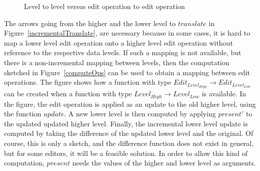 \begin{figure}
\begin{small}
\begin{center}
\begin{center}
\begin{small}
\bigskip \noindent
{}
\end{small}
\end{center}\caption{Level to level versus edit operation to edit operation }\label{fromLevelToOp} 
\end{center}
\end{small}
\end{figure}


The arrows going from the higher and the lower level to $translate$ in Figure~\ref{incrementalTranslate}, are necessary because in some cases, it is hard to map a lower level edit operation onto a higher level edit operation without reference to the respective data levels. If such a mapping is not available, but there is a non-incremental mapping between levels, then the computation sketched in Figure~\ref{computeOps} can be used to obtain a mapping between edit operations. The figure shows how a function with type 
$Edit_{Level_{High}} \rightarrow Edit_{Level_{Low}}$ can be created when a function with type 
$Level_{High} \rightarrow Level_{Low}$  is available. In the figure, the edit operation is applied as an update to the old higher level, using the function $update$. A new lower level is then computed by applying $present'$ to the updated updated higher level. Finally, the incremental lower level update is computed by taking the difference of the updated lower level and the original. Of course, this is only a sketch, and the difference function does not exist in general, but for some editors, it will be a feasible solution. In order to allow this kind of computation, $present$ needs the values of the higher and lower level as arguments.

